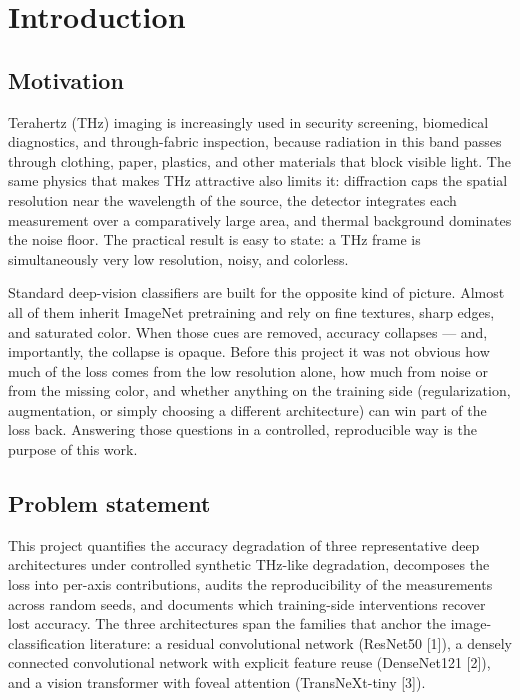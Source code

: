 \section{Introduction}
\label{sec:intro}

\subsection{Motivation}
Terahertz (THz) imaging is increasingly used in security screening, biomedical
diagnostics, and through-fabric inspection, because radiation in this band
passes through clothing, paper, plastics, and other materials that block
visible light. The same physics that makes THz attractive also limits it:
diffraction caps the spatial resolution near the wavelength of the source,
the detector integrates each measurement over a comparatively large area, and
thermal background dominates the noise floor. The practical result is easy to
state: a THz frame is simultaneously very low resolution, noisy, and
colorless.

Standard deep-vision classifiers are built for the opposite kind of picture.
Almost all of them inherit ImageNet pretraining and rely on fine textures,
sharp edges, and saturated color. When those cues are removed, accuracy
collapses --- and, importantly, the collapse is opaque. Before this project it
was not obvious how much of the loss comes from the low resolution alone, how
much from noise or from the missing color, and whether anything on the
training side (regularization, augmentation, or simply choosing a different
architecture) can win part of the loss back. Answering those questions in a
controlled, reproducible way is the purpose of this work.

\subsection{Problem statement}
This project quantifies the accuracy degradation of three representative deep
architectures under controlled synthetic THz-like degradation, decomposes the
loss into per-axis contributions, audits the reproducibility of the
measurements across random seeds, and documents which training-side
interventions recover lost accuracy. The three architectures span the
families that anchor the image-classification literature: a residual
convolutional network (ResNet50 [1]), a densely connected convolutional
network with explicit feature reuse (DenseNet121 [2]), and a vision
transformer with foveal attention (TransNeXt-tiny [3]).

